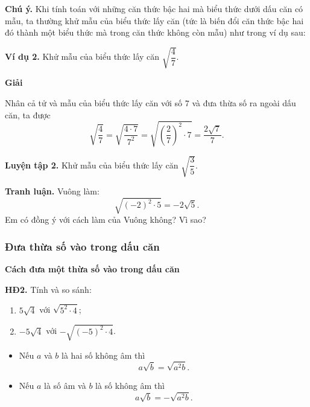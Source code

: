 \begin{lesson}
    \answerline
    \answerline

    \textbf{Chú ý.} Khi tính toán với những căn thức bậc hai mà biểu thức dưới dấu căn có mẫu, ta thường khử mẫu của biểu thức lấy căn (tức là biến đổi căn thức bậc hai đó thành một biểu thức mà trong căn thức không còn mẫu) như trong ví dụ sau:

    \textbf{Ví dụ 2.} Khử mẫu của biểu thức lấy căn $\sqrt{\dfrac47}$.

    \textbf{Giải}

    Nhân cả tử và mẫu của biểu thức lấy căn với số $7$ và đưa thừa số ra ngoài dấu căn, ta được
    \[
        \sqrt{\dfrac47}
        =\sqrt{\dfrac{4\cdot7}{7^2}}
        =\sqrt{\left(\dfrac27\right)^2\cdot7}
        =\dfrac{2\sqrt7}{7}.
    \]

    \textbf{Luyện tập 2.} Khử mẫu của biểu thức lấy căn $\sqrt{\dfrac35}$.

    \answerline

    \textbf{Tranh luận.} Vuông làm:
    \[
        \sqrt{(-2)^2\cdot5}=-2\sqrt5.
    \]
    Em có đồng ý với cách làm của Vuông không? Vì sao?

    \answerline

    \subsubsection{Đưa thừa số vào trong dấu căn}

    \textbf{Cách đưa một thừa số vào trong dấu căn}

    \textbf{HĐ2.} Tính và so sánh:
    \begin{enumerate}[label=\alph*)]
        \item $5\sqrt4$ với $\sqrt{5^2\cdot4}$;
        \item $-5\sqrt4$ với $-\sqrt{(-5)^2\cdot4}$.
    \end{enumerate}

    \answerline

    \begin{keyconcept}
        \begin{itemize}
            \item Nếu $a$ và $b$ là hai số không âm thì
            \[
                a\sqrt b=\sqrt{a^2b}.
            \]
            \item Nếu $a$ là số âm và $b$ là số không âm thì
            \[
                a\sqrt b=-\sqrt{a^2b}.
            \]
        \end{itemize}
    \end{keyconcept}


\end{lesson}
